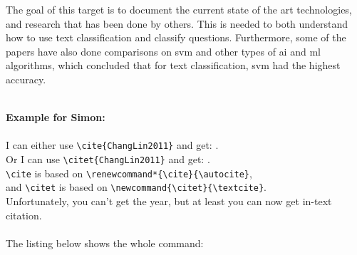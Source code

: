 \label{chap:chapter2}
The goal of this target is to document the current state of the art technologies, and research 
that has been done by others. This is needed to both understand how to use text classification and 
classify questions. Furthermore, some of the papers have also done comparisons on \gls{svm} and 
other types of \gls{ai} and \gls{ml} algorithms, which concluded that for text classification, 
\gls{svm} had the highest accuracy.

\begin{comment}
For Harvard style referencing, you use the \texttt{citep} and \texttt{citet} style of citation. 
These give parentheses around the citation or the name of the author as text with the year in parentheses.  
If you want the citation to be read in a sentence then you use  \texttt{citet}. 
If you want it to be just parenthetical to the sentence at the end, then use \texttt{citep}.


\end{comment}
~\\
\textbf{Example for Simon:} \\\\
I can either use \verb|\cite{ChangLin2011}| and get: \cite{ChangLin2011}. \\
Or I can use \verb|\citet{ChangLin2011}| and get: \citet{ChangLin2011}. \\
\verb|\cite| is based on \verb|\renewcommand*{\cite}{\autocite}|, \\
and \verb|\citet| is based on \verb|\newcommand{\citet}{\textcite}|. \\
Unfortunately, you can't get the year, but at least you can now get in-text citation. \\\\
The listing below shows the whole command:

